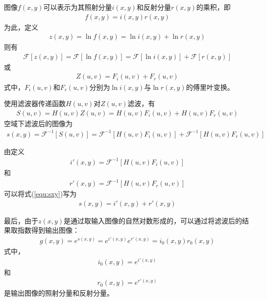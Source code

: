 \documentclass{hitreport}
\begin{document}
图像$f\left(x,y\right)$可以表示为其照射分量$i\left(x,y\right)$和反射分量$r\left(x,y\right)$的乘积，即
\begin{align}
f\left(x,y\right) = i\left(x,y\right)r\left(x,y\right)
\end{align}
为此，定义
\begin{align}
z\left(x,y\right) = \ln f\left(x,y\right) = \ln i\left(x,y\right) + \ln r\left(x,y\right)
\end{align}
则有
\begin{align}
\mathscr{F}\left[z\left(x,y\right)\right] = \mathscr{F}\left[\ln f\left(x,y\right)\right] = \mathscr{F}\left[\ln i\left(x,y\right)\right] + \mathscr{F}\left[r\left(x,y\right)\right]
\end{align}
或
\begin{align}
Z\left(u,v\right) = F_i\left(u,v\right) + F_r\left(u,v\right)
\end{align}
式中，$F_i\left(u,v\right)$和$F_r\left(u,v\right)$分别为$\ln i\left(x,y\right)$与$\ln r\left(x,y\right)$的傅里叶变换。

使用滤波器传递函数$H\left(u,v\right)$对$Z\left(u,v\right)$滤波，有
\begin{align}
S\left(u,v\right) = H\left(u,v\right)Z\left(u,v\right) = H\left(u,v\right)F_i\left(u,v\right) + H\left(u,v\right)F_r\left(u,v\right)
\end{align}
空域下滤波后的图像为
\begin{align}\label{equ:sxy}
s\left(x,y\right) = \mathscr{F}^{-1}\left[S\left(u,v\right)\right] = \mathscr{F}^{-1}\left[H\left(u,v\right)F_i\left(u,v\right)\right] + \mathscr{F}^{-1}\left[H\left(u,v\right)F_r\left(u,v\right)\right]
\end{align}

由定义
\begin{align}
i'\left(x,y\right) = \mathscr{F}^{-1}\left[H\left(u,v\right)F_i\left(u,v\right)\right]
\end{align}
和
\begin{align}
r'\left(x,y\right) = \mathscr{F}^{-1}\left[H\left(u,v\right)F_r\left(u,v\right)\right]
\end{align}
可以将式(\ref{equ:sxy})写为
\begin{align}
s\left(x,y\right) = i'\left(x,y\right) + r'\left(x,y\right)
\end{align}

最后，由于$z\left(x,y\right)$是通过取输入图像的自然对数形成的，可以通过将滤波后的结果取指数得到输出图像：
\begin{align}
g\left(x,y\right) = e^{s\left(x,y\right)} = e^{i'\left(x,y\right)}e^{r'\left(x,y\right)} = i_0\left(x,y\right)r_0\left(x,y\right)
\end{align}
式中，
\begin{align}
i_0\left(x,y\right) = e^{i'\left(x,y\right)}
\end{align}
和
\begin{align}
r_0\left(x,y\right) = e^{r'\left(x,y\right)}
\end{align}
是输出图像的照射分量和反射分量。
\end{document}
